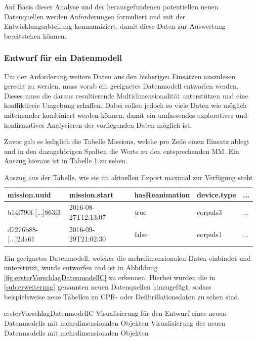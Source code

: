 Auf Basis dieser Analyse und der herausgefundenen potentiellen neuen Datenquellen werden Anforderungen formuliert und mit der Entwicklungsabteilung kommuniziert, damit diese Daten zur Auswertung bereitstehen können.

\subsubsection{Entwurf für ein Datenmodell}
\label{subsub:datenmodell}
Um der Anforderung weitere Daten aus den bisherigen Einsätzen auszulesen gerecht zu werden, muss vorab ein geeignetes Datenmodell entworfen werden.
Dieses muss die daraus resultierende Multidimensionalität unterstützen und eine konfliktfreie Umgebung schaffen.
Dabei sollen jedoch so viele Daten wie möglich miteinander kombiniert werden können, damit ein umfassendes exploratives und konfirmatives Analysieren der vorliegenden Daten möglich ist.

Zuvor gab es lediglich die Tabelle \glqq Missions\grqq{}, welche pro Zeile einen Einsatz ablegt und in den dazugehörigen Spalten die Werte zu den entsprechenden \gls{MM}.
Ein Auszug hieraus ist in Tabelle \ref{tbl:missions} zu sehen.

\begin{table}[htb]
\centering
\begin{tabular}{|l|l|l|l|l|}
\hline
\textbf{mission.uuid}   & \textbf{mission.start} & \textbf{hasReanimation} & \textbf{device.type} & \textbf{...} \\ \hline
b14f790f-{[}...{]}863f3 & 2016-08-27T12:13:07    & true                    & corpuls3             & ...          \\ \hline
d7276b88-{[}...{]}2da61 & 2016-09-29T21:02:30    & false                   & corpuls1             & ...          \\ \hline
\end{tabular}%
\caption[Aktuelle Export-Tabelle]{Auszug aus der Tabelle, wie sie im aktuellen Export maximal zur Verfügung steht}
\label{tbl:missions}
\end{table}

Ein geeignetes Datenmodell, welches die mehrdimensionalen Daten einbindet und unterstützt, wurde entworfen und ist in Abbildung \ref{fig:ersterVorschlagDatenmodellC} zu erkennen.
Hierbei wurden die in \ref{sub:erweiterung} genannten neuen Datenquellen hinzugefügt, sodass beispielsweise neue Tabellen zu \gls{CPR}- oder Defibrillationsdaten zu sehen sind.

\bildbreit
{ersterVorschlagDatenmodellC}
{Visualisierung für den Entwurf eines neuen Datenmodells mit mehrdimensionalen Objekten}
{Visualisierung des neuen Datenmodells mit mehrdimensionalen Objekten}

